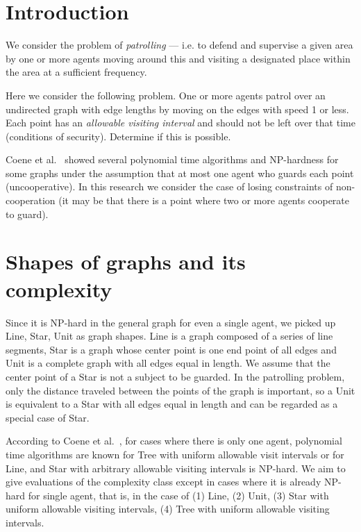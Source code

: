 \section{Introduction}

We consider the problem of {\it patrolling} --- i.e. to defend and supervise a given area by one or more agents moving around this and visiting a designated place within the area at a sufficient frequency.~\cite{czyzowicz2011boundary}

Here we consider the following problem. 
One or more agents patrol over an undirected graph with edge lengths by moving on the edges with speed 1 or less. Each point has an {\it allowable visiting interval} and should not be left over that time (conditions of security). Determine if this is possible.

Coene et al.~\cite{coene2011charlemagne} showed several polynomial time algorithms and NP-hardness for some graphs under the assumption that at most one agent who guards each point (uncooperative).
In this research we consider the case of losing constraints of non-cooperation (it may be that there is a point where two or more agents cooperate to guard).


\section{Shapes of graphs and its complexity}

Since it is NP-hard in the general graph for even a single agent, we picked up Line, Star, Unit as graph shapes.
Line is a graph composed of a series of line segments, Star is a graph whose center point is one end point of all edges and Unit is a complete graph with all edges equal in length.
We assume that the center point of a Star is not a subject to be guarded.
In the patrolling problem, only the distance traveled between the points of the graph is important, so a Unit is equivalent to a Star with all edges equal in length and can be regarded as a special case of Star.


According to Coene et al.~\cite{coene2011charlemagne}, for cases where there is only one agent, polynomial time algorithms are known for Tree with uniform allowable visit intervals or for Line,
and Star with arbitrary allowable visiting intervals is NP-hard.
We aim to give evaluations of the complexity class except in cases where it is already NP-hard for single agent, that is, in the case of (1) Line, (2) Unit, (3) Star with uniform allowable visiting intervals, (4) Tree with uniform allowable visiting intervals.

